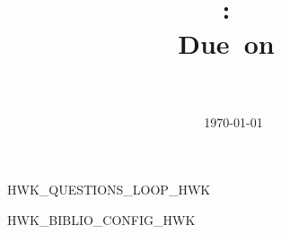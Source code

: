 \documentclass[fleqn,twoside]{article}
\title{
\vspace{2in}
\textmd{\textbf{\hmwkClass:\ \hmwkTitle}}\\
\normalsize\vspace{0.1in}\small{Due\ on\ \hmwkDueDate}\\
\vspace{0.1in}\large{\textit{\hmwkClassInstructor\ \hmwkClassTime}}
\vspace{3in}
}
\author{\textbf{\hmwkAuthorName}}
\date{\today} %
\begin{document}
\maketitle



\newpage



HWK_QUESTIONS_LOOP_HWK




HWK_BIBLIO_CONFIG_HWK
\end{document}
